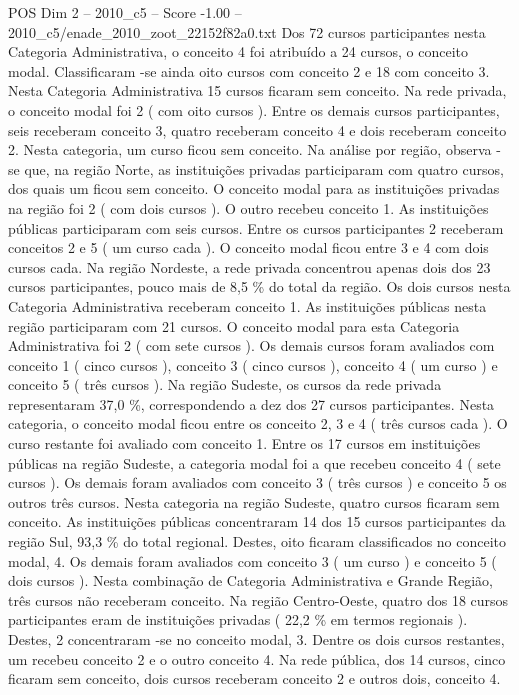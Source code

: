 \begin{textsample}{POS Dim 2 – 2010\_c5 – Score -1.00 – 2010\_c5/enade\_2010\_zoot\_22152f82a0.txt}
Dos 72 cursos participantes nesta Categoria Administrativa, o conceito 4 foi atribuído a 24 cursos, o conceito modal.
Classificaram -se ainda oito cursos com conceito 2 e 18 com conceito 3.
Nesta Categoria Administrativa 15 cursos ficaram sem conceito.
Na rede privada, o conceito modal foi 2 ( com oito cursos ).
Entre os demais cursos participantes, seis receberam conceito 3, quatro receberam conceito 4 e dois receberam conceito 2.
Nesta categoria, um curso ficou sem conceito.
Na análise por região, observa -se que, na região Norte, as instituições privadas participaram com quatro cursos, dos quais um ficou sem conceito.
O conceito modal para as instituições privadas na região foi 2 ( com dois cursos ).
O outro recebeu conceito 1.
As instituições públicas participaram com seis cursos.
Entre os cursos participantes 2 receberam conceitos 2 e 5 ( um curso cada ).
O conceito modal ficou entre 3 e 4 com dois cursos cada.
Na região Nordeste, a rede privada concentrou apenas dois dos 23 cursos participantes, pouco mais de 8,5 \% do total da região.
Os dois cursos nesta Categoria Administrativa receberam conceito 1.
As instituições públicas nesta região participaram com 21 cursos.
O conceito modal para esta Categoria Administrativa foi 2 ( com sete cursos ).
Os demais cursos foram avaliados com conceito 1 ( cinco cursos ), conceito 3 ( cinco cursos ), conceito 4 ( um curso ) e conceito 5 ( três cursos ).
Na região Sudeste, os cursos da rede privada representaram 37,0 \%, correspondendo a dez dos 27 cursos participantes.
Nesta categoria, o conceito modal ficou entre os conceito 2, 3 e 4 ( três cursos cada ).
O curso restante foi avaliado com conceito 1.
Entre os 17 cursos em instituições públicas na região Sudeste, a categoria modal foi a que recebeu conceito 4 ( sete cursos ).
Os demais foram avaliados com conceito 3 ( três cursos ) e conceito 5 os outros três cursos.
Nesta categoria na região Sudeste, quatro cursos ficaram sem conceito.
As instituições públicas concentraram 14 dos 15 cursos participantes da região Sul, 93,3 \% do total regional.
Destes, oito ficaram classificados no conceito modal, 4.
Os demais foram avaliados com conceito 3 ( um curso ) e conceito 5 ( dois cursos ).
Nesta combinação de Categoria Administrativa e Grande Região, três cursos não receberam conceito.
Na região Centro-Oeste, quatro dos 18 cursos participantes eram de instituições privadas ( 22,2 \% em termos regionais ).
Destes, 2 concentraram -se no conceito modal, 3.
Dentre os dois cursos restantes, um recebeu conceito 2 e o outro conceito 4.
Na rede pública, dos 14 cursos, cinco ficaram sem conceito, dois cursos receberam conceito 2 e outros dois, conceito 4.

\end{textsample}
